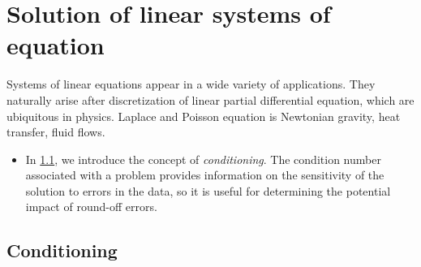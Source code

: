\chapter{Solution of linear systems of equation}
\label{cha:solution_of_linear_systems}

Systems of linear equations appear in a wide variety of applications.
They naturally arise after discretization of linear partial differential equation,
which are ubiquitous in physics.
Laplace and Poisson equation is  Newtonian gravity, heat transfer, fluid flows.


\begin{itemize}
    \item 
        In \cref{sec:conditioning},
        we introduce the concept of \emph{conditioning}.
        The condition number associated with a problem provides information on the sensitivity of the solution to errors in the data,
        so it is useful for determining the potential impact of round-off errors.
\end{itemize}

\section{Conditioning}%
\label{sec:conditioning}
